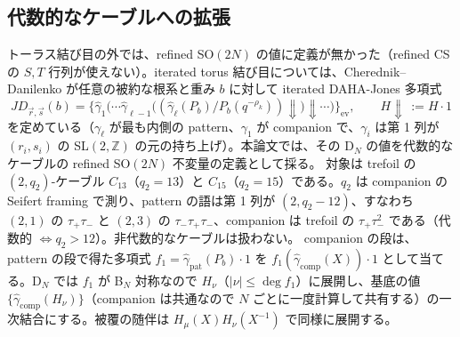\subsection{代数的なケーブルへの拡張}\label{sec:cable}
トーラス結び目の外では、refined SO$(2N)$ の値に定義が無かった（refined CS の $S, T$ 行列が使えない）。iterated torus 結び目については、Cherednik--Danilenko \cite{CD14} が任意の被約な根系と重み $b$ に対して iterated DAHA-Jones 多項式
\[
JD_{\vec r,\vec s}(b) = \bigl\{\hat\gamma_1\bigl(\cdots\hat\gamma_{\ell-1}\bigl((\hat\gamma_\ell(P_b)/P_b(q^{-\rho_k}))\!\Downarrow\bigr)\!\Downarrow\cdots\bigr)\bigr\}_{\mathrm{ev}},\qquad H\!\Downarrow\, := H\cdot 1
\]
を定めている（$\gamma_\ell$ が最も内側の pattern、$\gamma_1$ が companion で、$\gamma_i$ は第 1 列が $(r_i, s_i)$ の SL$(2,\mathbb{Z})$ の元の持ち上げ）。本論文では、その D$_N$ の値を代数的なケーブルの refined SO$(2N)$ 不変量の定義として採る。
対象は trefoil の $(2, q_2)$-ケーブル $C_{13}$（$q_2 = 13$）と $C_{15}$（$q_2 = 15$）である。$q_2$ は companion の Seifert framing で測り、pattern の語は第 1 列が $(2, q_2 - 12)$、すなわち $(2,1)$ の $\tau_+\tau_-$ と $(2,3)$ の $\tau_-\tau_+\tau_-$、companion は trefoil の $\tau_+\tau_-^2$ である（代数的 $\Leftrightarrow q_2 > 12$）。非代数的なケーブルは扱わない。
companion の段は、pattern の段で得た多項式 $f_1 = \hat\gamma_{\mathrm{pat}}(P_b)\cdot 1$ を $f_1(\hat\gamma_{\mathrm{comp}}(X))\cdot 1$ として当てる。D$_N$ では $f_1$ が B$_N$ 対称なので $H_\nu$（$|\nu| \le \deg f_1$）に展開し、基底の値 $\{\hat\gamma_{\mathrm{comp}}(H_\nu)\}$（companion は共通なので $N$ ごとに一度計算して共有する）の一次結合にする。被覆の随伴は $H_\mu(X)H_\nu(X^{-1})$ で同様に展開する。

